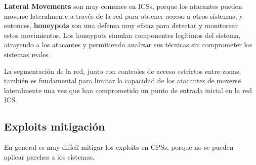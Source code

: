 \textbf{Lateral Movements} son muy comunes en ICSs, porque los atacantes pueden moverse lateralmente a través de la red para obtener acceso a otros sistemas, y entonces, \textbf{honeypots} son una defensa muy eficaz para detectar y monitorear estos movimientos. Los honeypots simulan componentes legítimos del sistema, atrayendo a los atacantes y permitiendo analizar sus técnicas sin comprometer los sistemas reales.

La segmentación de la red, junto con controles de acceso estrictos entre zonas, también es fundamental para limitar la capacidad de los atacantes de moverse lateralmente una vez que han comprometido un punto de entrada inicial en la red ICS.

\subsection{Exploits mitigación}

En general es muy difícil mitigar los exploits en CPSs, porque no se pueden aplicar parches a los sistemas.




